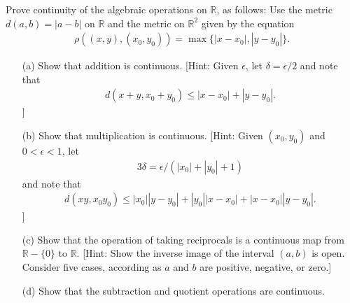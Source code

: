\begin{exercise}[Munkres 21.12]
  Prove continuity of the algebraic operations on $\mathbb{R}$, as follows: Use the metric $d(a, b) = |a - b|$ on $\mathbb{R}$ and the metric on $\mathbb{R}^2$ given by the equation
  \begin{align*}
    \rho((x, y), (x_0, y_0)) = \max\{|x - x_0|, |y - y_0|\}.
  \end{align*}
  \begin{enumerate} 
    \item[(a)] Show that addition is continuous. [Hint: Given $\epsilon$, let $\delta = \epsilon/2$ and note that 
    \begin{align*}
      d(x + y, x_0 + y_0) \leq |x - x_0| + |y - y_0|.
    \end{align*}
    ]
    \item[(b)] Show that multiplication is continuous. [Hint: Given $(x_0, y_0)$ and $0 < \epsilon < 1$, let 
    \begin{align*}
      3\delta = \epsilon/(|x_0| + |y_0| + 1)
    \end{align*}
    and note that
    \begin{align*}
      d(xy, x_0y_0) \leq |x_0||y - y_0| + |y_0||x - x_0| + |x - x_0||y - y_0|.
    \end{align*}
    ]
    \item[(c)] Show that the operation of taking reciprocals is a continuous map from $\mathbb{R} - \{0\}$ to $\mathbb{R}$. [Hint: Show the inverse image of the interval $(a, b)$ is open. Consider five cases, according as $a$ and $b$ are positive, negative, or zero.]
    \item[(d)] Show that the subtraction and quotient operations are continuous.
  \end{enumerate}
\end{exercise}


